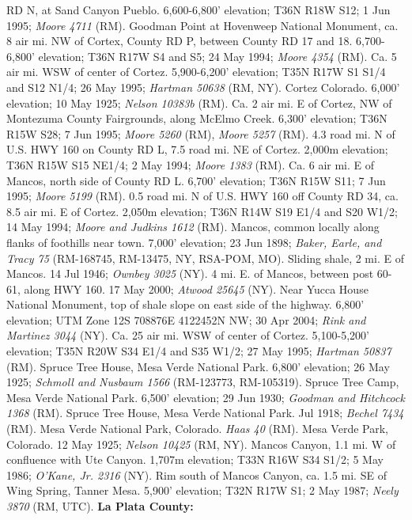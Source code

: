 RD N, at Sand Canyon Pueblo. 6,600-6,800' elevation; T36N R18W S12;
1 Jun 1995; \textit{Moore 4711} (RM).
Goodman Point at Hovenweep National Monument, ca. 8 air mi. NW of Cortex,
County RD P, between County RD 17 and 18. 6,700-6,800' elevation;
T36N R17W S4 and S5; 24 May 1994; \textit{Moore 4354} (RM).
Ca. 5 air mi. WSW of center of Cortez. 5,900-6,200' elevation; T35N R17W S1 S1/4
and S12 N1/4; 26 May 1995; \textit{Hartman 50638} (RM, NY).
Cortez Colorado. 6,000' elevation; 10 May 1925; \textit{Nelson 10383b} (RM).
Ca. 2 air mi. E of Cortez, NW of Montezuma County Fairgrounds, along McElmo
Creek. 6,300' elevation; T36N R15W S28; 7 Jun 1995; \textit{Moore 5260} (RM),
\textit{Moore 5257} (RM).
4.3 road mi. N of U.S. HWY 160 on County RD L, 7.5 road mi. NE of Cortez.
2,000m elevation; T36N R15W S15 NE1/4; 2 May 1994; \textit{Moore 1383} (RM).
Ca. 6 air mi. E of Mancos, north side of County RD L. 6,700' elevation;
T36N R15W S11; 7 Jun 1995; \textit{Moore 5199} (RM).
0.5 road mi. N of U.S. HWY 160 off County RD 34, ca. 8.5 air mi. E of Cortez.
2,050m elevation; T36N R14W S19 E1/4 and S20 W1/2; 14 May 1994;
\textit{Moore and Judkins 1612} (RM).
Mancos, common locally along flanks of foothills near town.
7,000' elevation; 23 Jun 1898;
\textit{Baker, Earle, and Tracy 75} (RM-168745, RM-13475, NY, RSA-POM, MO).
Sliding shale, 2 mi. E of Mancos. 14 Jul 1946; \textit{Ownbey 3025} (NY).
4 mi. E. of Mancos, between post 60-61, along HWY 160. 17 May 2000;
\textit{Atwood 25645} (NY).
Near Yucca House National Monument, top of shale slope on east side of the
highway. 6,800' elevation; UTM Zone 12S 708876E 4122452N NW; 30 Apr 2004;
\textit{Rink and Martinez 3044} (NY).
Ca. 25 air mi. WSW of center of Cortez. 5,100-5,200' elevation; T35N R20W S34
E1/4 and S35 W1/2; 27 May 1995; \textit{Hartman 50837} (RM).
Spruce Tree House, Mesa Verde National Park. 6,800' elevation; 26 May 1925;
\textit{Schmoll and Nusbaum 1566} (RM-123773, RM-105319).
Spruce Tree Camp, Mesa Verde National Park. 6,500' elevation; 29 Jun 1930;
\textit{Goodman and Hitchcock 1368} (RM).
Spruce Tree House, Mesa Verde National Park. Jul 1918; \textit{Bechel 7434} (RM).
Mesa Verde National Park, Colorado. \textit{Haas 40} (RM).
Mesa Verde Park, Colorado. 12 May 1925; \textit{Nelson 10425} (RM, NY).
Mancos Canyon, 1.1 mi. W of confluence with Ute Canyon. 1,707m elevation;
T33N R16W S34 S1/2; 5 May 1986; \textit{O'Kane, Jr. 2316} (NY).
Rim south of Mancos Canyon, ca. 1.5 mi. SE of Wing Spring, Tanner Mesa.
5,900' elevation; T32N R17W S1; 2 May 1987; \textit{Neely 3870} (RM, UTC).
  \textbf{La Plata County:}
